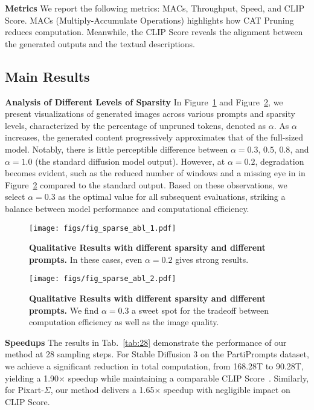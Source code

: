 \documentclass[10pt]{article}
\begin{document}
\textbf{Metrics}
We report the following metrics: MACs, Throughput, Speed, and CLIP Score. MACs (Multiply-Accumulate Operations) highlights how CAT Pruning reduces computation. Meanwhile, the CLIP Score reveals the alignment between the generated outputs and the textual descriptions.


\subsection{Main Results}
\textbf{Analysis of Different Levels of Sparsity}
In Figure~\ref{fig:sparse_abl_1} and Figure~\ref{fig:sparse_abl_2}, we present visualizations of generated images across various prompts and sparsity levels, characterized by the percentage of unpruned tokens, denoted as $\alpha$. As $\alpha$ increases, the generated content progressively approximates that of the full-sized model. Notably, there is little perceptible difference between $\alpha = 0.3$, $0.5$, $0.8$, and $\alpha = 1.0$ (the standard diffusion model output). However, at $\alpha = 0.2$, degradation becomes evident, such as the reduced number of windows and a missing eye in in Figure~\ref{fig:sparse_abl_2} compared to the standard output. Based on these observations, we select $\alpha = 0.3$ as the optimal value for all subsequent evaluations, striking a balance between model performance and computational efficiency. %

\vspace{-1pt}
\begin{figure}
    \centering
    \texttt{[image: figs/fig\_sparse\_abl\_1.pdf]}
    \caption{\textbf{Qualitative Results with different sparsity and different prompts.} In these cases, even $\alpha = 0.2$ gives strong results. }
    \label{fig:sparse_abl_1}
\end{figure}
\begin{figure}
    \centering
    \texttt{[image: figs/fig\_sparse\_abl\_2.pdf]}
    \caption{\textbf{Qualitative Results with different sparsity and different prompts.} We find $\alpha = 0.3$ a sweet spot for the tradeoff between computation efficiency as well as the image quality.}
    \label{fig:sparse_abl_2}
\end{figure}
\textbf{Speedups}
The results in Tab.~\ref{tab:28} demonstrate the performance of our method at 28 sampling steps. For Stable Diffusion 3 on the PartiPrompts dataset, we achieve a significant reduction in total computation, from 168.28T to 90.28T, yielding a 1.90$\times$ speedup while maintaining a comparable CLIP Score~\citep{Radford2021LearningTV,hessel2022clipscorereferencefreeevaluationmetric}. Similarly, for Pixart-$\Sigma$, our method delivers a 1.65$\times$ speedup with negligible impact on CLIP Score.
\end{document}
